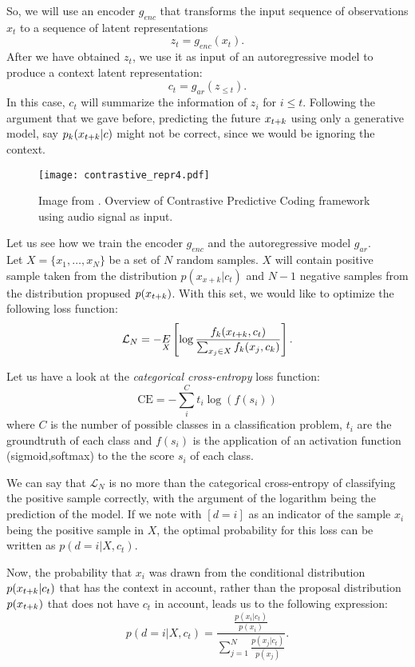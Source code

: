 So, we will use an encoder $g_{enc}$ that transforms the input sequence of observations $x_t$ to a sequence of latent representations
$$
z_t = g_{enc}(x_t).
$$
After we have obtained $z_t$, we use it as input of an autoregressive model to produce a context latent representation:
$$
c_t = g_{ar}(z_{\leq t}).
$$
In this case, $c_t$ will summarize the information of $z_i$ for $i \leq t$. Following the argument that we gave before, predicting the future $x_{t+k}$ using only a generative model, say $p_k(x_{t+k}|c)$
might not be correct, since we would be ignoring the context. \\

\begin{figure}[H]
    \centering 
    \texttt{[image: contrastive\_repr4.pdf]}
    \caption{Image from \citep{oord_representation_2019}. Overview of Contrastive Predictive Coding framework using audio signal as input. }
\end{figure}



Let us see how we train the encoder $g_{enc}$ and the autoregressive model $g_{ar}$.\\

Let $X = \{x_1,\dots,x_N\}$ be a set of $N$ random samples. $X$ will contain positive sample taken from the distribution $p(x_{x+k}|c_t)$ and $N-1$ negative
samples from the distribution propused $p(x_{t+k})$. With this set, we would like to optimize the following loss function:
\begin{equation}\label{NCE:loss}
\mathcal L_N = - \underset{X}{E} \left[\log \frac{f_k(x_{t+k},c_t)}{\sum_{x_j \in X} f_k(x_j,c_k)}\right].
\end{equation}

Let us have a look at the \emph{categorical cross-entropy} loss function:
\[
    \text{CE} = -\sum_i^C t_i \log(f(s_i))    
\]
where $C$ is the number of possible classes in a classification problem, $t_i$ are the groundtruth of each class and $f(s_i)$ is the application of an activation function (sigmoid,softmax) to the the score $s_i$ of each class.

We can say that $\mathcal L_N$ is no more than the categorical cross-entropy of classifying the positive sample correctly, with the argument of the logarithm being the prediction
of the model. If we note with $[d = i]$ as an indicator of the sample $x_i$ being the positive sample in $X$, the optimal probability for this loss can be written as $p(d = i|X,c_t)$. 

Now, the probability that $x_i$ was drawn from the conditional distribution $p(x_{t+k}|c_t)$ that has the context in account, rather than the proposal distribution $p(x_{t+k})$ that does not have $c_t$ in account, leads us to the following expression:
$$
p(d = i | X , c_t) = \frac{ \frac{p(x_i|c_t)}{p(x_i)}}{\sum_{j=1}^N \frac{p(x_j|c_t)}{p(x_j)}}.
$$

